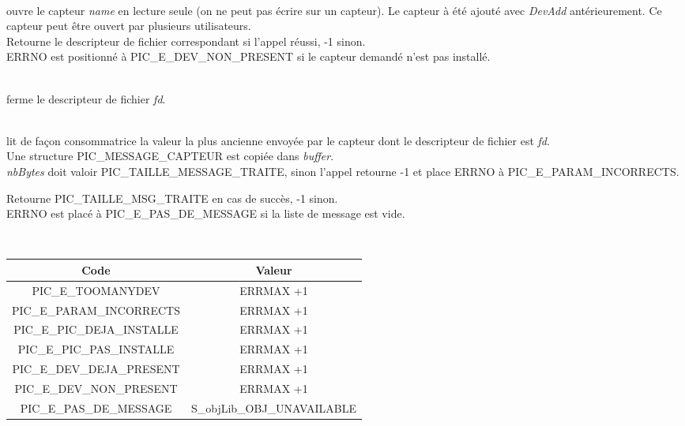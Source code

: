 \begin{m_desc}
\item [open(char* name, int mode, int flag)]\hfill\\
ouvre le capteur \textsl{name} en lecture seule (on ne peut pas écrire
sur un capteur).
Le capteur à été ajouté avec \textsl{DevAdd} antérieurement.
 Ce capteur peut être ouvert par plusieurs utilisateurs.\\
Retourne le descripteur de fichier correspondant si l'appel réussi, -1 sinon.\\
ERRNO est positionné à PIC\_E\_DEV\_NON\_PRESENT si le capteur demandé 
n'est pas installé.

\item [close(int fd)]\hfill\\
ferme le descripteur de fichier \textsl{fd}.

\item [read(int fd, char* buffer, int nbBytes)]\hfill\\
lit de façon consommatrice la valeur la plus ancienne envoyée par le 
capteur dont le descripteur de fichier est  \textsl{fd}.\\
Une structure PIC\_MESSAGE\_CAPTEUR est copiée dans \textsl{buffer}.\\
\textsl{nbBytes} doit valoir PIC\_TAILLE\_MESSAGE\_TRAITE, sinon l'appel
retourne -1 et place ERRNO à PIC\_E\_PARAM\_INCORRECTS. 

Retourne PIC\_TAILLE\_MSG\_TRAITE en cas de succès, -1 sinon.\\
ERRNO est placé à PIC\_E\_PAS\_DE\_MESSAGE si la liste de message
est vide.


\item[Valeurs des codes ERRNO:]\hfill\\
\begin{center}
   \begin{tabular}{ | c | c | }
     \hline
Code                         &   Valeur\\ \hline
PIC\_E\_TOOMANYDEV		     &   ERRMAX +1\\ \hline
PIC\_E\_PARAM\_INCORRECTS    &   ERRMAX +1\\ \hline
PIC\_E\_PIC\_DEJA\_INSTALLE  &   ERRMAX +1\\ \hline
PIC\_E\_PIC\_PAS\_INSTALLE   &   ERRMAX +1\\ \hline
PIC\_E\_DEV\_DEJA\_PRESENT   &   ERRMAX +1\\ \hline
PIC\_E\_DEV\_NON\_PRESENT    &   ERRMAX +1\\ \hline
PIC\_E\_PAS\_DE\_MESSAGE	 &	 S\_objLib\_OBJ\_UNAVAILABLE\\ \hline
   \end{tabular}
 \end{center}

\end{m_desc}

\vfill
\pagebreak
